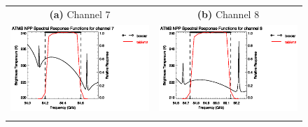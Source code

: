 \begin{figure}[H]
  \centering
  \begin{tabular}{c c}
    \textsf{\textbf{(a)} Channel 7} &
    \textsf{\textbf{(b)} Channel 8} \\
    \includegraphics[bb=70 400 300 559,clip,scale=1.0]{graphics/srf/table12/atms_npp.ch7.osrf.eps} &
    \includegraphics[bb=70 400 300 559,clip,scale=1.0]{graphics/srf/table12/atms_npp.ch8.osrf.eps} \\\\


\end{tabular}
\end{figure}
